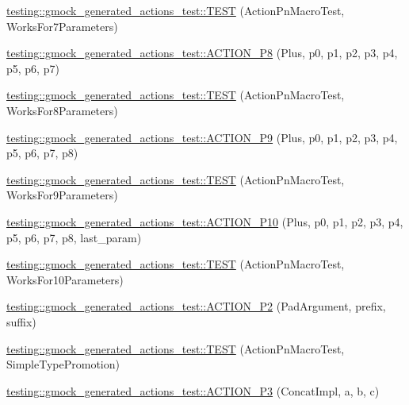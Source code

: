 \begin{DoxyCompactItemize}
\item 
\hyperlink{namespacetesting_1_1gmock__generated__actions__test_add3cba52186c7ce384808c222492ee18}{testing\+::gmock\+\_\+generated\+\_\+actions\+\_\+test\+::\+T\+E\+ST} (Action\+Pn\+Macro\+Test, Works\+For7\+Parameters)
\item 
\hyperlink{namespacetesting_1_1gmock__generated__actions__test_ad8766a6dbaeffbf36658d3b5f75d3b00}{testing\+::gmock\+\_\+generated\+\_\+actions\+\_\+test\+::\+A\+C\+T\+I\+O\+N\+\_\+\+P8} (Plus, p0, p1, p2, p3, p4, p5, p6, p7)
\item 
\hyperlink{namespacetesting_1_1gmock__generated__actions__test_a1913bedf1d5cf736e91f2be119de0d5f}{testing\+::gmock\+\_\+generated\+\_\+actions\+\_\+test\+::\+T\+E\+ST} (Action\+Pn\+Macro\+Test, Works\+For8\+Parameters)
\item 
\hyperlink{namespacetesting_1_1gmock__generated__actions__test_ab023ad5e95ca2c2b8845963ce7222e00}{testing\+::gmock\+\_\+generated\+\_\+actions\+\_\+test\+::\+A\+C\+T\+I\+O\+N\+\_\+\+P9} (Plus, p0, p1, p2, p3, p4, p5, p6, p7, p8)
\item 
\hyperlink{namespacetesting_1_1gmock__generated__actions__test_a52d6dc447a4a71524adfeb7c8f7b6a68}{testing\+::gmock\+\_\+generated\+\_\+actions\+\_\+test\+::\+T\+E\+ST} (Action\+Pn\+Macro\+Test, Works\+For9\+Parameters)
\item 
\hyperlink{namespacetesting_1_1gmock__generated__actions__test_a3c6e7ef6aefc94efc9e815e92f0b3e47}{testing\+::gmock\+\_\+generated\+\_\+actions\+\_\+test\+::\+A\+C\+T\+I\+O\+N\+\_\+\+P10} (Plus, p0, p1, p2, p3, p4, p5, p6, p7, p8, last\+\_\+param)
\item 
\hyperlink{namespacetesting_1_1gmock__generated__actions__test_a564fd77344f58b26577452a380c93935}{testing\+::gmock\+\_\+generated\+\_\+actions\+\_\+test\+::\+T\+E\+ST} (Action\+Pn\+Macro\+Test, Works\+For10\+Parameters)
\item 
\hyperlink{namespacetesting_1_1gmock__generated__actions__test_ad58030fe83ad47cdb4ff027f8399adb4}{testing\+::gmock\+\_\+generated\+\_\+actions\+\_\+test\+::\+A\+C\+T\+I\+O\+N\+\_\+\+P2} (Pad\+Argument, prefix, suffix)
\item 
\hyperlink{namespacetesting_1_1gmock__generated__actions__test_ad42236ad6c6d01fad6dd947ca6163d59}{testing\+::gmock\+\_\+generated\+\_\+actions\+\_\+test\+::\+T\+E\+ST} (Action\+Pn\+Macro\+Test, Simple\+Type\+Promotion)
\item 
\hyperlink{namespacetesting_1_1gmock__generated__actions__test_ae46434959151b83249e52d4869e28cf0}{testing\+::gmock\+\_\+generated\+\_\+actions\+\_\+test\+::\+A\+C\+T\+I\+O\+N\+\_\+\+P3} (Concat\+Impl, a, b, c)

\end{DoxyCompactItemize}
